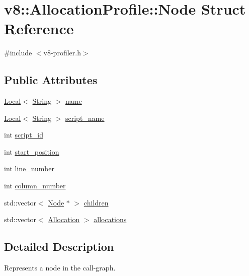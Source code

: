 \hypertarget{structv8_1_1_allocation_profile_1_1_node}{}\section{v8\+:\+:Allocation\+Profile\+:\+:Node Struct Reference}
\label{structv8_1_1_allocation_profile_1_1_node}


{\ttfamily \#include $<$v8-\/profiler.\+h$>$}

\subsection*{Public Attributes}
\begin{DoxyCompactItemize}
\item 
\hyperlink{classv8_1_1_local}{Local}$<$ \hyperlink{classv8_1_1_string}{String} $>$ \hyperlink{structv8_1_1_allocation_profile_1_1_node_af9f2c323d6a11e836c02e8ac88adc5a8}{name}
\item 
\hyperlink{classv8_1_1_local}{Local}$<$ \hyperlink{classv8_1_1_string}{String} $>$ \hyperlink{structv8_1_1_allocation_profile_1_1_node_acd6567ac06a0bae713390559128e9c62}{script\+\_\+name}
\item 
int \hyperlink{structv8_1_1_allocation_profile_1_1_node_a4a746de878d9ad42b32fda4c365b98fb}{script\+\_\+id}
\item 
int \hyperlink{structv8_1_1_allocation_profile_1_1_node_a6caceefbf826a0425adc74331cc7a910}{start\+\_\+position}
\item 
int \hyperlink{structv8_1_1_allocation_profile_1_1_node_ac9773c92a3af3a9a9420337599e68bd9}{line\+\_\+number}
\item 
int \hyperlink{structv8_1_1_allocation_profile_1_1_node_a7cf86acc298428c858673fc1f9dbe305}{column\+\_\+number}
\item 
std\+::vector$<$ \hyperlink{structv8_1_1_allocation_profile_1_1_node}{Node} $\ast$ $>$ \hyperlink{structv8_1_1_allocation_profile_1_1_node_a176673c0440cb1baaf7713e14da84db0}{children}
\item 
std\+::vector$<$ \hyperlink{structv8_1_1_allocation_profile_1_1_allocation}{Allocation} $>$ \hyperlink{structv8_1_1_allocation_profile_1_1_node_a6ee0934b35ba77fb5d8b53f02d5a3068}{allocations}
\end{DoxyCompactItemize}


\subsection{Detailed Description}
Represents a node in the call-\/graph. 

